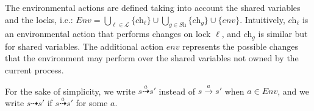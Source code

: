 The environmental actions are defined taking into account the shared variables and the locks, i.e.:
$
	\textit{Env} = \bigcup_{\ell \in \mathcal{L}}\{\textit{ch}_\ell\} \cup  \bigcup_{g \in \textit{Sh}}\{\textit{ch}_g\} \cup \{\textit{env}\}.
$
Intuitively,  $\textit{ch}_\ell$ is an environmental action that performs changes on lock $\ell$, and $\textit{ch}_g$ is similar but for shared variables. The additional action $\textit{env}$ represents the possible changes that the environment may perform over the shared variables not owned by the current process.

For the sake of simplicity, we write $s \overset{a}{\dashrightarrow} s'$ instead of $s \xrightarrow{a} s'$ when $a \in Env$, and we write $s \dashrightarrow s'$ if $s \overset{a}{\dashrightarrow} s'$ for some $a$.

